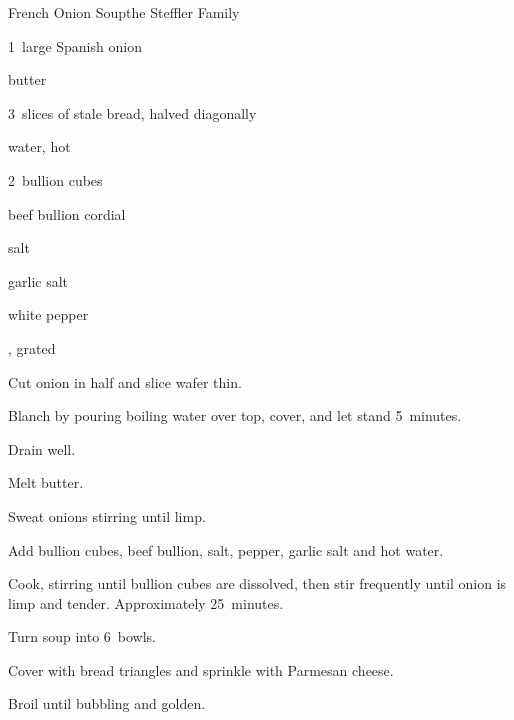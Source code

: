 \begin{recipe}{French Onion Soup}{the Steffler Family}{}

\begin{ingredients}
\item 1~large Spanish onion
\item \C{\quarter} butter
\item 3~slices of stale bread, halved diagonally
\item {} water, hot
\item 2~bullion cubes
\item \C{\quarter} beef bullion cordial
\item {} salt
\item \tp{\eighth} garlic salt
\item \tp{\eighth} white pepper
\item \C{\half} , grated
\end{ingredients}

\begin{directions}
\item Cut onion in half and slice wafer thin.
\item Blanch by pouring boiling water over top, cover, and let stand 5~minutes.
\item Drain well.
\item Melt butter.
\item Sweat onions stirring until limp.
\item Add bullion cubes, beef bullion, salt, pepper, garlic salt and hot water.
\item Cook, stirring until bullion cubes are dissolved, then stir frequently until onion is limp and tender. Approximately 25~minutes.
\item Turn soup into 6~bowls.
\item Cover with bread triangles and sprinkle with Parmesan cheese.
\item Broil until bubbling and golden.
\end{directions}
\end{recipe}
